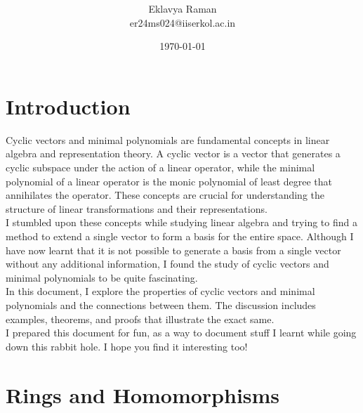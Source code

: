 \documentclass[openany]{book}
\begin{document}
\title{\Large{} \\ \vspace{5pt}}
\author{Eklavya Raman \\ \vspace{5pt} er24ms024@iiserkol.ac.in \\ \vspace{5pt}}
\date{\today}
\maketitle
\tableofcontents
\listoftheorems[
    show=mytheorem,
    title={List of Theorems}]

\chapter*{Introduction}
Cyclic vectors and minimal polynomials are fundamental concepts in linear algebra and representation theory. A cyclic vector is a vector that generates a cyclic subspace under the action of a linear operator, while the minimal polynomial of a linear operator is the monic polynomial of least degree that annihilates the operator. These concepts are crucial for understanding the structure of linear transformations and their representations. \\
I stumbled upon these concepts while studying linear algebra and trying to find a method to extend a single vector to form a basis for the entire space. Although I have now learnt that it is not possible to generate a basis from a single vector without any additional information, I found the study of cyclic vectors and minimal polynomials to be quite fascinating. \\
In this document, I explore the properties of cyclic vectors and minimal polynomials and the connections between them. The discussion includes examples, theorems, and proofs that illustrate the exact same. \\
I prepared this document for fun, as a way to document stuff I learnt while going down this rabbit hole. I hope you find it interesting too!
\chapter{Rings and Homomorphisms}
\end{document}
